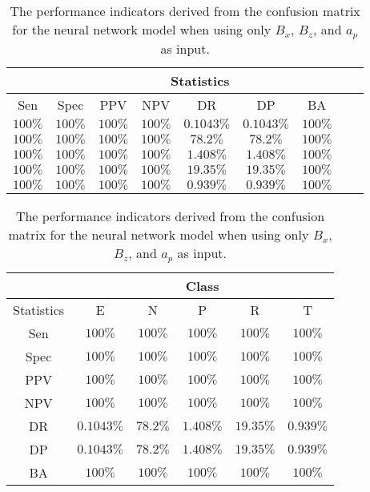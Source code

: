 \begin{table}[!ht]
	\centering
	\begin{tabular}{|c|c|c|c|c|c|c|c|c|}
		\hline
		 & \multicolumn{7}{c|}{Statistics} \\ \hline
		Sen & Spec & PPV & NPV & DR & DP & BA \\ \hline
		$100\%$ & $100\%$ & $100\%$ & $100\%$ & $0.1043\%$ & $0.1043\%$ & $100\%$ \\ \hline
		$100\%$ & $100\%$ & $100\%$ & $100\%$ & $78.2\%$ & $78.2\%$ & $100\%$ \\ \hline
		$100\%$ & $100\%$ & $100\%$ & $100\%$ & $1.408\%$ & $1.408\%$ & $100\%$ \\ \hline
		$100\%$ & $100\%$ & $100\%$ & $100\%$ & $19.35\%$ & $19.35\%$ & $100\%$ \\ \hline
		$100\%$ & $100\%$ & $100\%$ & $100\%$ & $0.939\%$ & $0.939\%$ & $100\%$ \\ \hline
	\end{tabular}
	\caption{The performance indicators derived from the confusion matrix for the neural network model when using only $B_{x}$, $B_{z}$, and $a_{p}$ as input.}
	\label{tab:cs:xzap:nnet}
\end{table}

\begin{table}[!ht]
	\centering
	\begin{tabular}{|c|c|c|c|c|c|}
		\hline
		 & \multicolumn{5}{c|}{Class} \\ \hline
		Statistics & E & N & P & R & T \\ \hline
		Sen & $100\%$ & $100\%$ & $100\%$ & $100\%$ & $100\%$ \\ \hline
		Spec & $100\%$ & $100\%$ & $100\%$ & $100\%$ & $100\%$ \\ \hline
		PPV & $100\%$ & $100\%$ & $100\%$ & $100\%$ & $100\%$ \\ \hline
		NPV & $100\%$ & $100\%$ & $100\%$ & $100\%$ & $100\%$ \\ \hline
		DR & $0.1043\%$ & $78.2\%$ & $1.408\%$ & $19.35\%$ & $0.939\%$ \\ \hline
		DP & $0.1043\%$ & $78.2\%$ & $1.408\%$ & $19.35\%$ & $0.939\%$ \\ \hline
		BA & $100\%$ & $100\%$ & $100\%$ & $100\%$ & $100\%$ \\ \hline
	\end{tabular}
	\caption{The performance indicators derived from the confusion matrix for the neural network model when using only $B_{x}$, $B_{z}$, and $a_{p}$ as input.}
	\label{tab:cs:reverse:xzap:nnet}
\end{table}

